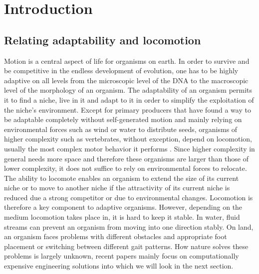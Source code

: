 \documentclass[main]{subfiles}
\begin{document}
\setcounter{chapter}{0}

\chapter{Introduction} %

\label{Chapter\thechapter} %


\section{Relating adaptability and locomotion}

Motion is a central aspect of life for organisms on earth. In order to survive and be competitive in the endless development of evolution, one has to be highly adaptive on all levels from the microscopic level of the DNA to the macroscopic level of the morphology of an organism. The adaptability of an organism permits it to find a niche, live in it and adapt to it in order to simplify the exploitation of the niche's environment. Except for primary producers that have found a way to be adaptable completely without self-generated motion and mainly relying on environmental forces such as wind or water to distribute seeds, organisms of higher complexity such as vertebrates, without exception, depend on locomotion, usually the most complex motor behavior it performs \cite{bib:Grillner2000}. Since higher complexity in general needs more space and therefore these organisms are larger than those of lower complexity, it does not suffice to rely on environmental forces to relocate. The ability to locomote enables an organism to extend the size of its current niche or to move to another niche if the attractivity of its current niche is reduced due a strong competitor or due to environmental changes. Locomotion is therefore a key component to adaptive organisms. However, depending on the medium locomotion takes place in, it is hard to keep it stable. In water, fluid streams can prevent an organism from moving into one direction stably. On land, an organism faces problems with different obstacles and appropriate foot placement or switching between different gait patterns. How nature solves these problems is largely unknown, recent papers mainly focus on computationally expensive engineering solutions into which we will look in the next section.
\end{document}
